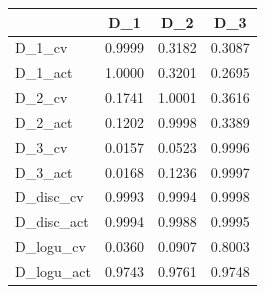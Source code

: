 \begin{tabular}{lccc}
\toprule
& D_1 & D_2 & D_3 \\
\midrule
D\_1\_cv & 0.9999 & 0.3182 & 0.3087 \\
D\_1\_act & 1.0000 & 0.3201 & 0.2695 \\
D\_2\_cv & 0.1741 & 1.0001 & 0.3616 \\
D\_2\_act & 0.1202 & 0.9998 & 0.3389 \\
D\_3\_cv & 0.0157 & 0.0523 & 0.9996 \\
D\_3\_act & 0.0168 & 0.1236 & 0.9997 \\
D\_disc\_cv & 0.9993 & 0.9994 & 0.9998 \\
D\_disc\_act & 0.9994 & 0.9988 & 0.9995 \\
D\_logu\_cv & 0.0360 & 0.0907 & 0.8003 \\
D\_logu\_act & 0.9743 & 0.9761 & 0.9748 \\
\bottomrule
\end{tabular}
